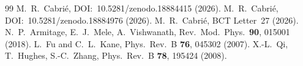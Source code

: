 \documentclass[aps,prl,twocolumn,superscriptaddress,floatfix]{revtex4-2}
\begin{document}
\begin{thebibliography}{99}
 M.~R.~Cabri\'e,
  DOI:~10.5281/zenodo.18884415 (2026).
 M.~R.~Cabri\'e,
  DOI:~10.5281/zenodo.18884976 (2026).
 M.~R.~Cabri\'e, BCT Letter~27 (2026).
 N.~P.~Armitage, E.~J.~Mele, A.~Vishwanath,
  Rev.\ Mod.\ Phys.\ \textbf{90}, 015001 (2018).
 L.~Fu and C.~L.~Kane,
  Phys.\ Rev.\ B \textbf{76}, 045302 (2007).
 X.-L.~Qi, T.~Hughes, S.-C.~Zhang,
  Phys.\ Rev.\ B \textbf{78}, 195424 (2008).
\end{thebibliography}
\end{document}
